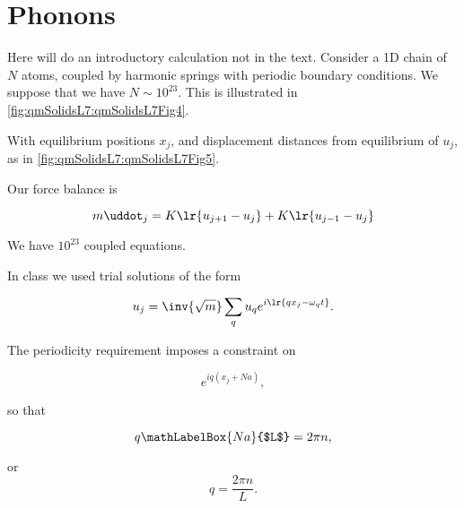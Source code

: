 %
%
\section{Phonons}

Here will do an introductory calculation not in the text.  Consider a 1D chain of $N$ atoms, coupled by harmonic springs with periodic boundary conditions.  We suppose that we have $N \sim 10^{23}$.  This is illustrated in \cref{fig:qmSolidsL7:qmSolidsL7Fig4}.


With equilibrium positions $x_j$, and displacement distances from equilibrium of $u_j$, as in \cref{fig:qmSolidsL7:qmSolidsL7Fig5}.


Our force balance is

\begin{dmath}\label{eqn:condensedMatterLecture7:180}
m \uddot_j = K \lr{ u_{j + 1} - u_j } + K \lr{ u_{j - 1} - u_j} 
\end{dmath}

We have $10^{23}$ coupled equations.

In class we used trial solutions of the form

\begin{dmath}\label{eqn:condensedMatterLecture7:200}
u_j = \inv{\sqrt{m}} \sum_q u_q e^{i \lr{ q x_j - \omega_q t} }.
\end{dmath}

The periodicity requirement imposes a constraint on

\begin{dmath}\label{eqn:condensedMatterLecture7:220}
e^{i q( x_j + N a) },
\end{dmath}

so that 

\begin{dmath}\label{eqn:condensedMatterLecture7:240}
q \mathLabelBox{N a}{$L$} = 2 \pi n,
\end{dmath}

or
\begin{dmath}\label{eqn:condensedMatterLecture7:260}
q = \frac{2 \pi n}{L}.
\end{dmath}

